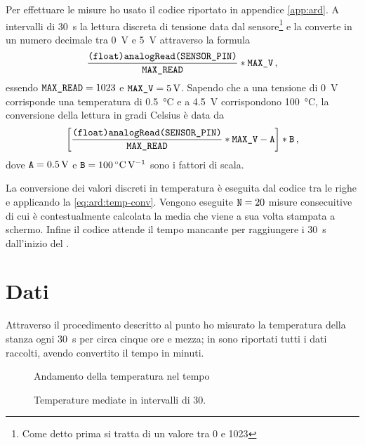             Per effettuare le misure ho usato il codice riportato in appendice \ref{app:ard}. A intervalli di \SI{30}{\second} la lettura discreta di tensione data dal sensore\footnote{Come detto prima si tratta di un valore tra \num{0} e \num{1023}} e la converte in un numero decimale tra \SI{0}{\volt} e \SI{5}{V} attraverso la formula
            \begin{equation*}
                \frac{\text{\ttfamily (float)analogRead(SENSOR\_PIN)}}{\text{\ttfamily MAX\_READ}} * \text{\ttfamily MAX\_V}
                \,,
            \end{equation*}
            essendo $\text{\ttfamily MAX\_READ} = 1023$ e $\text{\ttfamily MAX\_V} = \SI{5}{\volt}$. Sapendo che a una tensione di \SI{0}{\volt} corrisponde una temperatura di \SI{0.5}{\celsius} e a \SI{4.5}{\volt} corrispondono \SI{100}{\celsius}, la conversione della lettura in gradi Celsius è data da
            \begin{equation}
                \bqty{\frac{\text{\ttfamily (float)analogRead(SENSOR\_PIN)}}{\text{\ttfamily MAX\_READ}} * \text{\ttfamily MAX\_V} - \text{\ttfamily A}} * \text{\ttfamily B}
                \mycomma
                \label{eq:ard:temp-conv}
            \end{equation}
            dove $\text{\ttfamily A} = \SI{0.5}{\volt}$ e $\text{\ttfamily B} = \SI{100}{\celsius\per\volt}$ sono i fattori di scala.

            La conversione dei valori discreti in temperatura è eseguita dal codice tra le righe  e  applicando la \eqref{eq:ard:temp-conv}. Vengono eseguite $\text{\ttfamily N} = 20$ misure consecuitive di cui è contestualmente calcolata la media che viene a sua volta stampata a schermo. Infine il codice attende il tempo mancante per raggiungere i \SI{30}{\second} dall'inizio del \txtloop.

    \section{Dati}
        Attraverso il procedimento descritto al punto  ho misurato la temperatura della stanza ogni \SI{30}{s} per circa cinque ore e mezza; in  sono riportati tutti i dati raccolti, avendo convertito il tempo in minuti.

        \begin{figure}
            \centering
            
            \caption{Andamento della temperatura nel tempo}
            \label{fig:ard:raw-temp}
        \end{figure}%
        \begin{figure}
            \centering
            
            \caption{Temperature mediate in intervalli di \SI{30}{\min}.}
            \label{fig:ard:avg-temp}
        \end{figure}

